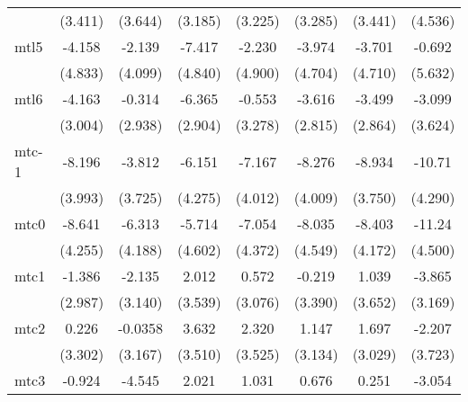 \documentclass{article}
\begin{document}
{\begin{longtable}{l*{7}{c}}
                &  (3.411)         &  (3.644)         &  (3.185)         &  (3.225)         &  (3.285)         &  (3.441)         &  (4.536)         \\
mtl5            &   -4.158         &   -2.139         &   -7.417         &   -2.230         &   -3.974         &   -3.701         &   -0.692         \\
                &  (4.833)         &  (4.099)         &  (4.840)         &  (4.900)         &  (4.704)         &  (4.710)         &  (5.632)         \\
mtl6            &   -4.163         &   -0.314         &   -6.365\sym{*}  &   -0.553         &   -3.616         &   -3.499         &   -3.099         \\
                &  (3.004)         &  (2.938)         &  (2.904)         &  (3.278)         &  (2.815)         &  (2.864)         &  (3.624)         \\
mtc-1           &   -8.196\sym{*}  &   -3.812         &   -6.151         &   -7.167         &   -8.276\sym{*}  &   -8.934\sym{*}  &   -10.71\sym{*}  \\
                &  (3.993)         &  (3.725)         &  (4.275)         &  (4.012)         &  (4.009)         &  (3.750)         &  (4.290)         \\
mtc0            &   -8.641         &   -6.313         &   -5.714         &   -7.054         &   -8.035         &   -8.403         &   -11.24\sym{*}  \\
                &  (4.255)         &  (4.188)         &  (4.602)         &  (4.372)         &  (4.549)         &  (4.172)         &  (4.500)         \\
mtc1            &   -1.386         &   -2.135         &    2.012         &    0.572         &   -0.219         &    1.039         &   -3.865         \\
                &  (2.987)         &  (3.140)         &  (3.539)         &  (3.076)         &  (3.390)         &  (3.652)         &  (3.169)         \\
mtc2            &    0.226         &  -0.0358         &    3.632         &    2.320         &    1.147         &    1.697         &   -2.207         \\
                &  (3.302)         &  (3.167)         &  (3.510)         &  (3.525)         &  (3.134)         &  (3.029)         &  (3.723)         \\
mtc3            &   -0.924         &   -4.545         &    2.021         &    1.031         &    0.676         &    0.251         &   -3.054         \\

\end{longtable}}
\end{document}
